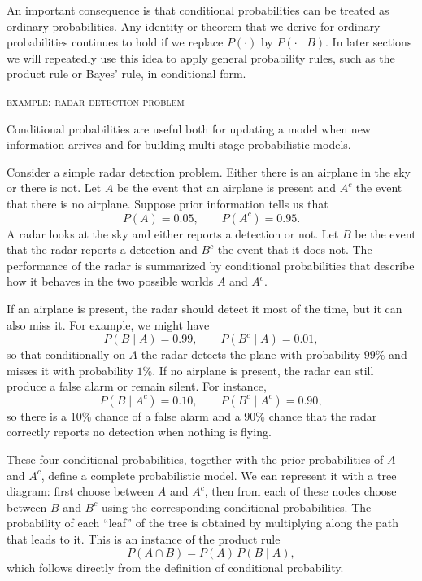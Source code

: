 An important consequence is that conditional probabilities can be treated as ordinary probabilities. Any identity or theorem that we derive for ordinary probabilities continues to hold if we replace \(P(\cdot)\) by \(P(\cdot \mid B)\). In later sections we will repeatedly use this idea to apply general probability rules, such as the product rule or Bayes’ rule, in conditional form.


\newpage
\textsc{example: radar detection problem}

Conditional probabilities are useful both for updating a model when new information arrives and for building multi-stage probabilistic models.

Consider a simple radar detection problem. Either there is an airplane in the sky or there is not. Let \(A\) be the event that an airplane is present and \(A^c\) the event that there is no airplane. Suppose prior information tells us that
\[
P(A) = 0.05, \qquad P(A^c) = 0.95.
\]
A radar looks at the sky and either reports a detection or not. Let \(B\) be the event that the radar reports a detection and \(B^c\) the event that it does not. The performance of the radar is summarized by conditional probabilities that describe how it behaves in the two possible worlds \(A\) and \(A^c\).

If an airplane is present, the radar should detect it most of the time, but it can also miss it. For example, we might have
\[
P(B \mid A) = 0.99, \qquad P(B^c \mid A) = 0.01,
\]
so that conditionally on \(A\) the radar detects the plane with probability \(99\%\) and misses it with probability \(1\%\). If no airplane is present, the radar can still produce a false alarm or remain silent. For instance,
\[
P(B \mid A^c) = 0.10, \qquad P(B^c \mid A^c) = 0.90,
\]
so there is a \(10\%\) chance of a false alarm and a \(90\%\) chance that the radar correctly reports no detection when nothing is flying.

These four conditional probabilities, together with the prior probabilities of \(A\) and \(A^c\), define a complete probabilistic model. We can represent it with a tree diagram: first choose between \(A\) and \(A^c\), then from each of these nodes choose between \(B\) and \(B^c\) using the corresponding conditional probabilities. The probability of each “leaf” of the tree is obtained by multiplying along the path that leads to it. This is an instance of the product rule
\[
P(A \cap B) = P(A)\,P(B \mid A),
\]
which follows directly from the definition of conditional probability.

